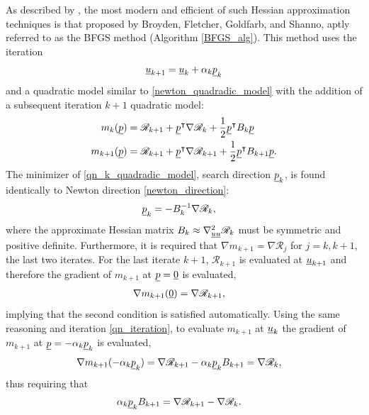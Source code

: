 As described by \citet{nocedal_2000}, the most modern and efficient of such Hessian approximation techniques is that proposed by Broyden, Fletcher, Goldfarb, and Shanno, aptly referred to as the BFGS method (Algorithm \cref{BFGS_alg}).  This method uses the iteration
\begin{align}
  \label{qn_iteration}
  \underline{u}_{k+1} = \underline{u}_k + \alpha_k \underline{p}_k
\end{align}
and a quadratic model similar to \cref{newton_quadradic_model} with the addition of a subsequent iteration $k+1$ quadratic model:
\begin{align}
  \label{qn_k_quadradic_model}
  m_{k}(\underline{p}) &= \mathscr{R}_{k+1} + \underline{p}^\intercal \nabla \mathscr{R}_{k} + \frac{1}{2} \underline{p}^\intercal B_{k} \underline{p} \\
  \label{qn_k+1_quadradic_model}
  m_{k+1}(\underline{p}) &= \mathscr{R}_{k+1} + \underline{p}^\intercal \nabla \mathscr{R}_{k+1} + \frac{1}{2} \underline{p}^\intercal B_{k+1} \underline{p}.
\end{align}
The minimizer of \cref{qn_k_quadradic_model}, search direction $\underline{p}_k$, is found identically to Newton direction \cref{newton_direction}:
\begin{align*}
  \underline{p}_k &= - B_k^{-1} \nabla \mathscr{R}_k,
\end{align*}
where the approximate Hessian matrix $B_k \approx \nabla_{\underline{u} \underline{u}}^2 \mathscr{R}_k$ must be symmetric and positive definite.  Furthermore, it is required that $\nabla m_{k+1} = \nabla \mathscr{R}_j$ for $j = k, k+1$, the last two iterates.  For the last iterate $k+1$, $\mathscr{R}_{k+1}$ is evaluated at $\underline{u}_{k+1}$ and therefore the gradient of $m_{k+1}$ at $\underline{p} = \underline{0}$ is evaluated,
\begin{align*}
  \nabla m_{k+1}(\underline{0}) &= \nabla \mathscr{R}_{k+1},
\end{align*}
implying that the second condition is satisfied automatically.  Using the same reasoning and iteration \cref{qn_iteration}, to evaluate $m_{k+1}$ at $\underline{u}_{k}$ the gradient of $m_{k+1}$ at $\underline{p} = -\alpha_k \underline{p}_k$ is evaluated,
\begin{align*}
  \nabla m_{k+1}(-\alpha_k \underline{p}_{k}) &= \nabla \mathscr{R}_{k+1} - \alpha_k \underline{p}_{k} B_{k+1} = \nabla \mathscr{R}_k,
\end{align*}
thus requiring that
\begin{align*}
  \alpha_k \underline{p}_k B_{k+1} &= \nabla \mathscr{R}_{k+1} - \nabla \mathscr{R}_k.
\end{align*}
